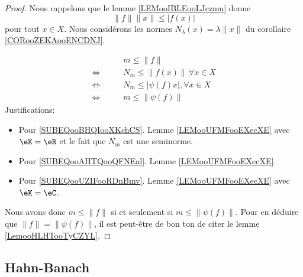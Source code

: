 \begin{proof}
    Nous rappelons que le lemme \ref{LEMooIBLEooLJczmu} donne
    \begin{equation}
        \| f \|\| x \|\leq | f(x) |
    \end{equation}
    pour tout \( x\in X\).
    Nous considérons les normes \( N_{\lambda}(x)=\lambda\| x \|\) du corollaire \ref{CORooZEKAooENCDNJ}.

    \begin{subequations}
        \begin{align}
                                &\qquad m\leq \| f \|\\
            \Longleftrightarrow &\qquad N_m\leq \| f(x) \|\, \forall x\in X \label{SUBEQooBHQIooXKchCS} \\
            \Longleftrightarrow &\qquad N_m\leq | \psi(f)x |,\forall x\in X     \label{SUBEQooAHTQooQFNEal}\\
            \Longleftrightarrow &\qquad m\leq \| \psi(f) \| \label{SUBEQooUZIFooRDnBmv}
        \end{align}
    \end{subequations}
    Justifications:
    \begin{itemize}
        \item Pour \ref{SUBEQooBHQIooXKchCS}. Lemme \ref{LEMooUFMFooEXecXE} avec \( \eK=\eR\) et le fait que \( N_m\) est une seminorme.
        \item Pour \ref{SUBEQooAHTQooQFNEal}. Lemme \ref{LEMooUFMFooEXecXE}.
        \item Pour \ref{SUBEQooUZIFooRDnBmv}. Lemme \ref{LEMooUFMFooEXecXE} avec \( \eK=\eC\).
    \end{itemize}
    Nous avons donc \( m\leq \| f \|\) si et seulement si \( m\leq \| \psi(f) \|\). Pour en déduire que \( \| f \|=\| \psi(f) \|\), il est peut-être de bon ton de citer le lemme \ref{LemooHLHTooTyCZYL}.
\end{proof}

\subsection{Hahn-Banach}

